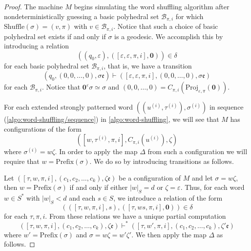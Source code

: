 \begin{proof}
The machine $M$ begins simulating the word shuffling algorithm after nondeterministically guessing a basic polyhedral set $\mathcal{B}_{\pi,i}$ for which $\mathrm{Shuffle}(\sigma) = (v,\pi)$ with $v \in \mathcal{B}_{\pi,i}$.
Notice that such a choice of basic polyhedral set exists if and only if $\sigma$ is a geodesic.
We accomplish this by introducing a relation
\[
	((q_0,\varepsilon),([\varepsilon,\varepsilon,\pi,i],\mathbf{0})) \in \delta
\]
for each basic polyhedral set $\mathcal{B}_{\pi,i}$,
that is, we have a transition
\begin{equation}\label{eq:first-transition}
	(q_0,(0,0,\ldots,0),\sigma\mathfrak{e})
	\vdash
	([\varepsilon,\varepsilon,\pi,i],(0,0,\ldots,0),\sigma\mathfrak{e})
\end{equation}
for each $\mathcal{B}_{\pi,i}$.
Notice that $\mathbf{0}^\varepsilon\sigma \simeq \sigma$ and $(0,0,\ldots,0) = C_{\pi,i}(\mathrm{Proj}_{\varepsilon,\pi}(\mathbf{0}))$.


For each extended strongly patterned word $((u^{(i)},\tau^{(i)}),\sigma^{(i)})$ in sequence (\ref{algo:word-shuffling/sequence}) in \cref{algo:word-shuffling}, we will see that $M$ has configurations of the form
\[
	([w,\tau^{(i)},\pi,i],C_{\pi,i}(u^{(i)}),\zeta)
\]
where $\sigma^{(i)} = w\zeta$.
In order to apply the map $\Delta$ from such a configuration we will require that $w = \mathrm{Prefix}(\sigma)$.
We do so by introducing transitions as follows.

Let $([\tau,w,\pi,i], (c_1, c_2, \ldots, c_k), \zeta\mathfrak{e})$ be a configuration of $M$ and let $\sigma = w \zeta$,
then $w = \mathrm{Prefix}(\sigma)$ if and only if either $|w|_S = d$ or $\zeta = \varepsilon$.
Thus, for each word $w \in S^*$ with $|w|_S < d$ and each $s \in S$, we introduce a relation of the form
\[
	(([\tau,w,\pi,i],s),([\tau,ws,\pi,i],\mathbf{0})) \in \delta
\]
for each $\tau,\pi,i$.
From these relations we have a unique partial computation
\begin{equation}\label{eq:finding-prefix}
	([\tau,w,\pi,i], (c_1, c_2, \ldots, c_k), \zeta\mathfrak{e})
	\vdash^*
	([\tau,w',\pi,i], (c_1, c_2, \ldots, c_k), \zeta'\mathfrak{e})
\end{equation}
where $w' = \mathrm{Prefix}(\sigma)$ and $\sigma = w\zeta = w'\zeta'$.
We then apply the map $\Delta$ as follows.


\end{proof}
